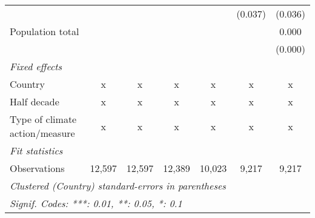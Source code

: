 \begin{tabular}{lcccccc}
                                                      &         &         &         &         & (0.037) & (0.036)\\   
   Population total                                   &         &         &         &         &         & 0.000\\   
                                                      &         &         &         &         &         & (0.000)\\   
   \emph{Fixed effects}\\
   Country                                            & x       & x       & x       & x       & x       & x\\  
   Half decade                                        & x       & x       & x       & x       & x       & x\\  
   Type of climate action/measure                     & x       & x       & x       & x       & x       & x\\  
   \midrule \emph{Fit statistics}\\
   Observations                                       & 12,597  & 12,597  & 12,389  & 10,023  & 9,217   & 9,217\\  
   \midrule
   \multicolumn{7}{l}{\emph{Clustered (Country) standard-errors in parentheses}}\\
   \multicolumn{7}{l}{\emph{Signif. Codes: ***: 0.01, **: 0.05, *: 0.1}}\\
\end{tabular}
\par\endgroup


